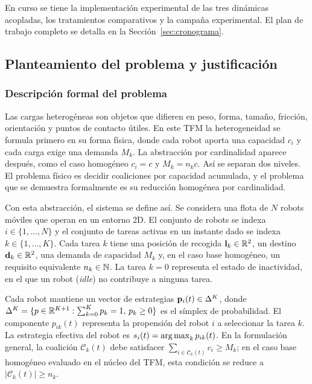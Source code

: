 En curso se tiene la implementación experimental de las tres dinámicas acopladas, los
tratamientos comparativos y la campaña experimental. El plan de trabajo
completo se detalla en la Sección~\ref{sec:cronograma}.

\subsection{Planteamiento del problema y justificación}
\label{sec:planteamiento}

\subsubsection{Descripción formal del problema}

Las cargas heterogéneas son objetos que difieren en peso, forma, tamaño, fricción,
orientación y puntos de contacto útiles. En este TFM la heterogeneidad se formula primero
en su forma física, donde cada robot aporta una capacidad $c_i$ y cada carga exige una demanda
$M_k$. La abstracción por cardinalidad aparece después, como el caso homogéneo
$c_i=c$ y $M_k=n_kc$. Así se separan dos niveles. El problema físico es decidir
coaliciones por capacidad acumulada, y el problema que se demuestra formalmente
es su reducción homogénea por cardinalidad.

Con esta abstracción, el sistema se define así. Se considera una flota de $N$ robots móviles que
operan en un entorno 2D. El conjunto de robots se indexa
$i \in \{1, \ldots, N\}$ y el conjunto de tareas activas en un instante dado se indexa
$k \in \{1, \ldots, K\}$. Cada tarea $k$ tiene una posición de recogida
$\mathbf{l}_k \in \mathbb{R}^2$, un destino $\mathbf{d}_k \in \mathbb{R}^2$, una demanda de capacidad
$M_k$ y, en el caso base homogéneo, un requisito equivalente $n_k \in \mathbb{N}$. La tarea
$k=0$ representa el estado de inactividad, en el que un robot (\textit{idle}) no
contribuye a ninguna tarea.

Cada robot mantiene un vector de estrategias $\mathbf{p}_i(t) \in \Delta^K$,
donde $\Delta^K = \{p \in \mathbb{R}^{K+1} : \sum_{k=0}^K p_k = 1,\, p_k \geq 0\}$
es el símplex de probabilidad. El componente $p_{ik}(t)$ representa la propensión
del robot $i$ a seleccionar la tarea $k$. La estrategia efectiva del robot es
$s_i(t) = \operatorname*{arg\,max}_k p_{ik}(t)$. En la formulación general, la coalición
$\mathcal{C}_k(t)$ debe satisfacer $\sum_{i\in\mathcal{C}_k(t)} c_i \geq M_k$;
en el caso base homogéneo evaluado en el
núcleo del TFM, esta condición se reduce a $|\mathcal{C}_k(t)| \geq n_k$.


